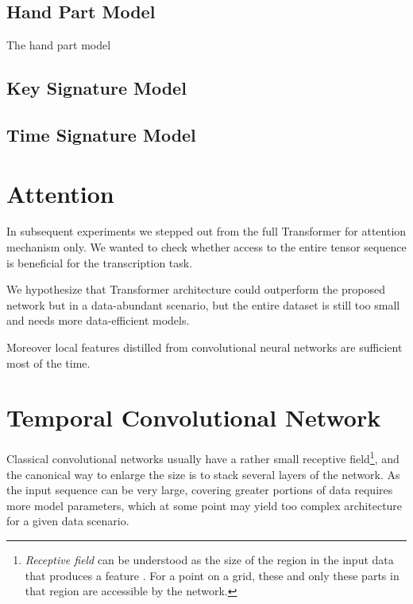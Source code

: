 \subsection{Hand Part Model}

The hand part model

\subsection{Key Signature Model}

\subsection{Time Signature Model}


\section{Attention}

In subsequent experiments we stepped out from the full Transformer for attention mechanism only. We wanted to check whether access to the entire tensor sequence is beneficial for the transcription task.

We hypothesize that Transformer architecture could outperform the proposed network but in a data-abundant scenario, but the entire dataset is still too small and needs more data-efficient models.

Moreover local features distilled from convolutional neural networks are sufficient most of the time. 
\missing



\section{Temporal Convolutional Network}

Classical convolutional networks usually have a rather small receptive field\footnote{\emph{Receptive field} can be understood as the size of the region in the input data that produces a feature \cite{Araujo2019}. For a point on a grid, these and only these parts in that region are accessible by the network.}, and the canonical way to enlarge the size is to stack several layers of the network. As the input sequence can be very large, covering greater portions of data requires more model parameters, which at some point may yield too complex architecture for a given data scenario.

